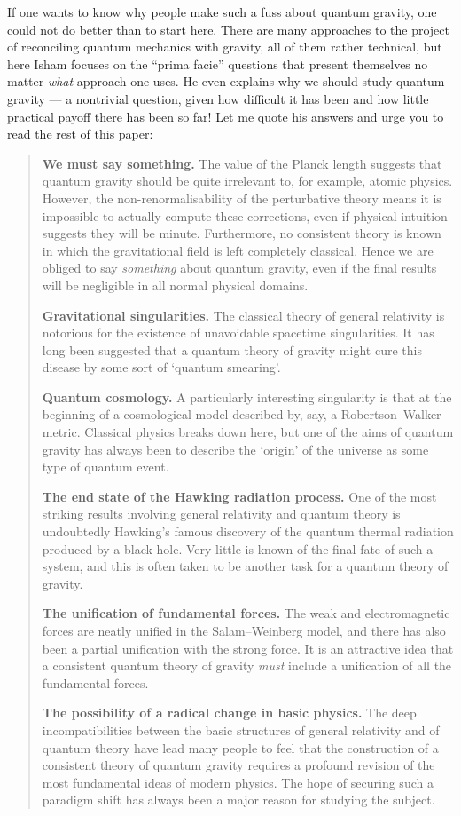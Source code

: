 \documentclass{article}
\begin{document}
If one wants to know why people make such a fuss about quantum gravity,
one could not do better than to start here. There are many approaches to
the project of reconciling quantum mechanics with gravity, all of them
rather technical, but here Isham focuses on the ``prima facie''
questions that present themselves no matter \emph{what} approach one
uses. He even explains why we should study quantum gravity --- a
nontrivial question, given how difficult it has been and how little
practical payoff there has been so far! Let me quote his answers and
urge you to read the rest of this paper:

\begin{quote}

\textbf{We must say something.} The value of the Planck length suggests
that quantum gravity should be quite irrelevant to, for example, atomic
physics. However, the non-renormalisability of the perturbative theory
means it is impossible to actually compute these corrections, even if
physical intuition suggests they will be minute. Furthermore, no
consistent theory is known in which the gravitational field is left
completely classical. Hence we are obliged to say \emph{something} about
quantum gravity, even if the final results will be negligible in all
normal physical domains.

\textbf{Gravitational singularities.} The classical theory of general
relativity is notorious for the existence of unavoidable spacetime
singularities. It has long been suggested that a quantum theory of
gravity might cure this disease by some sort of `quantum smearing'.

\textbf{Quantum cosmology.} A particularly interesting singularity is
that at the beginning of a cosmological model described by, say, a
Robertson--Walker metric. Classical physics breaks down here, but one of
the aims of quantum gravity has always been to describe the `origin' of
the universe as some type of quantum event.

\textbf{The end state of the Hawking radiation process.} One of the most
striking results involving general relativity and quantum theory is
undoubtedly Hawking's famous discovery of the quantum thermal radiation
produced by a black hole. Very little is known of the final fate of such
a system, and this is often taken to be another task for a quantum
theory of gravity.

\textbf{The unification of fundamental forces.} The weak and
electromagnetic forces are neatly unified in the Salam--Weinberg model,
and there has also been a partial unification with the strong force. It
is an attractive idea that a consistent quantum theory of gravity
\emph{must} include a unification of all the fundamental forces.

\textbf{The possibility of a radical change in basic physics.} The deep
incompatibilities between the basic structures of general relativity and
of quantum theory have lead many people to feel that the construction of
a consistent theory of quantum gravity requires a profound revision of
the most fundamental ideas of modern physics. The hope of securing such
a paradigm shift has always been a major reason for studying the
subject.

\end{quote}
\end{document}
